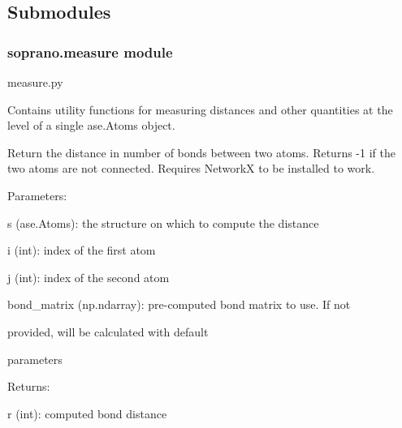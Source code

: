 \documentclass[letterpaper,10pt,english]{sphinxmanual}
\begin{document}
\subsection{Submodules}
\label{doctree/soprano:submodules}

\subsubsection{soprano.measure module}
\label{doctree/soprano.measure:soprano-measure-module}\label{doctree/soprano.measure::doc}\label{doctree/soprano.measure:module-soprano.measure}
measure.py

Contains utility functions for measuring distances and other quantities at
the level of a single ase.Atoms object.

\begin{fulllineitems}
\label{doctree/soprano.measure:soprano.measure.bondDistance}
Return the distance in number of bonds between two atoms. Returns -1 if
the two atoms are not connected. Requires NetworkX to be installed to
work.

\begin{DUlineblock}{0em}
\item[] Parameters:
\item[]
\begin{DUlineblock}{\DUlineblockindent}
\item[] s (ase.Atoms): the structure on which to compute the distance
\item[] i (int): index of the first atom
\item[] j (int): index of the second atom
\item[] bond\_matrix (np.ndarray): pre-computed bond matrix to use. If not
\item[]
\begin{DUlineblock}{\DUlineblockindent}
\item[] provided, will be calculated with default
\item[] parameters
\end{DUlineblock}
\end{DUlineblock}
\end{DUlineblock}

\begin{DUlineblock}{0em}
\item[] Returns:
\item[]
\begin{DUlineblock}{\DUlineblockindent}
\item[] r (int): computed bond distance
\end{DUlineblock}
\end{DUlineblock}

\end{fulllineitems}
\end{document}
